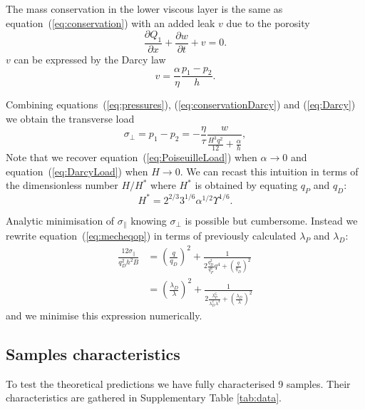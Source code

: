\documentclass[twocolumn,superscriptaddress,showpacs,preprintnumbers,
amsmath,amssymb,prl]{revtex4-1}
\begin{document}
The mass conservation in the lower viscous layer is the same as equation~(\ref{eq:conservation}) with an added leak $v$ due to the porosity
\begin{equation}
\frac{\partial Q_1}{\partial x} + \frac{\partial w}{\partial t} + v = 0.
\label{eq:conservationDarcy}
\end{equation}
%
$v$ can be expressed by the Darcy law
\begin{equation}
v = \frac{\alpha}{\eta} \frac{p_1-p_2}{h}.
\label{eq:Darcy}
\end{equation}

Combining equations~(\ref{eq:pressures}), (\ref{eq:conservationDarcy}) and (\ref{eq:Darcy}) we obtain the transverse load
\begin{equation}
\sigma_\perp = p_1-p_2 = - \frac{\eta}{\tau} \frac{w}{\frac{H^3 q^2}{12} + \frac{\alpha}{h}},
\label{eq:MixtLoad}
\end{equation}
%
Note that we recover equation~(\ref{eq:PoiseuilleLoad}) when $\alpha \rightarrow 0$ and equation~(\ref{eq:DarcyLoad}) when $H \rightarrow 0$. We can recast this intuition in terms of the dimensionless number $H/H^*$ where $H^*$ is obtained by equating $q_P$ and $q_D$:
\begin{equation}
H^* = 2^{2/3} 3^{1/6} \alpha^{1/2} \Upsilon^{1/6}.
\end{equation}

Analytic minimisation of $\sigma_\parallel$ knowing $\sigma_\perp$ is possible but cumbersome. Instead we rewrite equation~(\ref{eq:mecheqop}) in terms of previously calculated $\lambda_P$ and $\lambda_D$:
\begin{align}
\frac{12\sigma_\parallel}{q_D^2 h^2 B} &= \left(\frac{q}{q_D}\right)^2 + \frac{1}{2\frac{q_D^2}{q_P^6}q^4  + \left(\frac{q}{q_D}\right)^2}\\
&= \left(\frac{\lambda_D}{\lambda}\right)^2 + \frac{1}{2\frac{\lambda_P^6}{\lambda_D^2\lambda^4}  + \left(\frac{\lambda_D}{\lambda}\right)^2}
\end{align}
and we minimise this expression numerically.

\subsection*{Samples characteristics}
To test the theoretical predictions we have fully characterised 9 samples. Their characteristics are gathered in Supplementary Table \ref{tab:data}.
\end{document}
